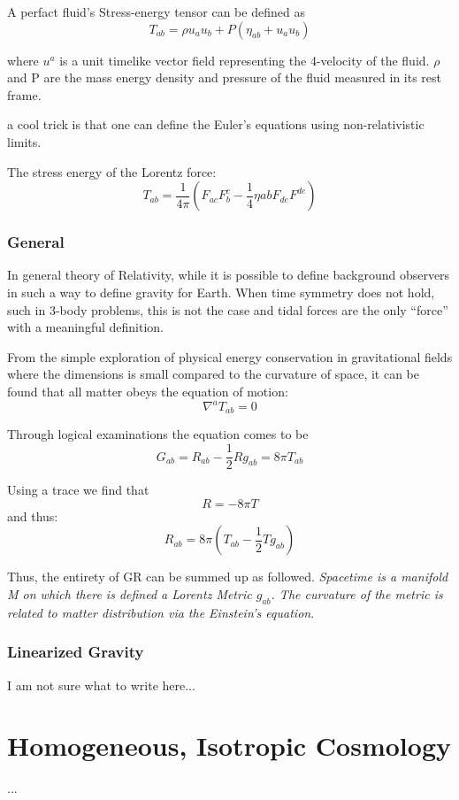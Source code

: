 A perfact fluid's Stress-energy tensor can be defined as
\[
T_{ab} = \rho u_a u_b + P(\eta_{ab}+ u_au_b)
\]

where $u^a$ is a unit timelike vector field representing the 4-velocity of the fluid. $\rho$ and P are the mass energy density and pressure of the fluid measured in its rest frame.

a cool trick is that one can define the Euler's equations using non-relativistic limits.

The stress energy of the Lorentz force:
\[
T_{ab}= \frac{1}{4 \pi} \left( F_{ac}F_b^c - \frac{1}{4}\eta{ab}F_{de}F^{de}   \right)
\]

\subsubsection{General}

In general theory of Relativity, while it is possible to define background observers in such a way to define gravity for Earth. When time symmetry does not hold, such in 3-body problems, this is not the case and tidal forces are the only ``force'' with a meaningful definition.

From the simple exploration of physical energy conservation in gravitational fields where the dimensions is small compared to the curvature of space, it can be found that all matter obeys the equation of motion:
\[
\nabla^a T_{ab}=0
\]

Through logical examinations the equation comes to be
\[
G_{ab}=R_{ab}-\frac{1}{2}Rg_{ab}=8 \pi T_{ab}
  \]

  Using a trace we find that
\[
R= - 8 \pi T
  \]
  and thus:
\[
R_{ab}= 8 \pi \left(T_{ab} - \frac{1}{2} T g_{ab}   \right)
  \]


  Thus, the entirety of GR can be summed up as followed. \emph{Spacetime is a manifold M on which there is defined a Lorentz Metric $g_{ab}$. The curvature of the metric is related to matter distribution via the Einstein's equation}.

\subsubsection{Linearized Gravity}

I am not sure what to write here...

\section{Homogeneous, Isotropic Cosmology}
...

